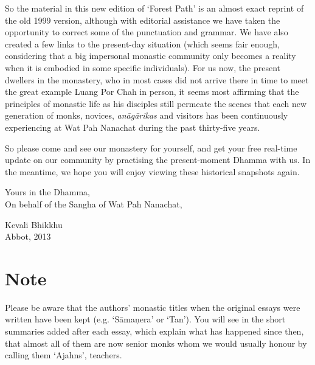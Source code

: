 So the material in this new edition of `Forest Path' is an almost exact
reprint of the old 1999 version, although with editorial assistance
we have taken the opportunity to correct some of the punctuation and
grammar. We have also created a few links to the present-day situation
 (which seems fair enough, considering that a big impersonal monastic
community only becomes a reality when it is embodied in some specific
individuals). For us now, the present dwellers in the monastery, who in
most cases did not arrive there in time to meet the great example Luang
Por Chah in person, it seems most affirming that the principles of
monastic life as his disciples still permeate the scenes that each new
generation of monks, novices, \emph{anāgārikas} and visitors has been
continuously experiencing at Wat Pah Nanachat during the past
thirty-five years.

So please come and see our monastery for yourself, and get your free
real-time update on our community by practising the present-moment
Dhamma with us. In the meantime, we hope you will enjoy viewing these
historical snapshots again.

\bigskip
{\par\raggedleft
Yours in the Dhamma,\\
On behalf of the Sangha of Wat Pah Nanachat,

Kevali Bhikkhu\\
Abbot, 2013
\par}

\vfill

\section{Note}

Please be aware that the authors' monastic titles when the original
essays were written have been kept (e.g. `Sāmaṇera' or `Tan').  You will
see in the short summaries added after each essay, which explain what
has happened since then, that almost all of them are now senior monks
whom we would usually honour by calling them `Ajahns', teachers.

